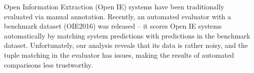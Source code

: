 Open Information Extraction (Open IE) systems have been traditionally evaluated via manual annotation. Recently, an automated evaluator with a benchmark dataset (OIE2016) was released -- it scores Open IE systems automatically by matching system predictions with predictions in the benchmark dataset. Unfortunately, our analysis reveals that its data is rather noisy, and the tuple matching in the evaluator has issues, making the results of automated comparisons less trustworthy.